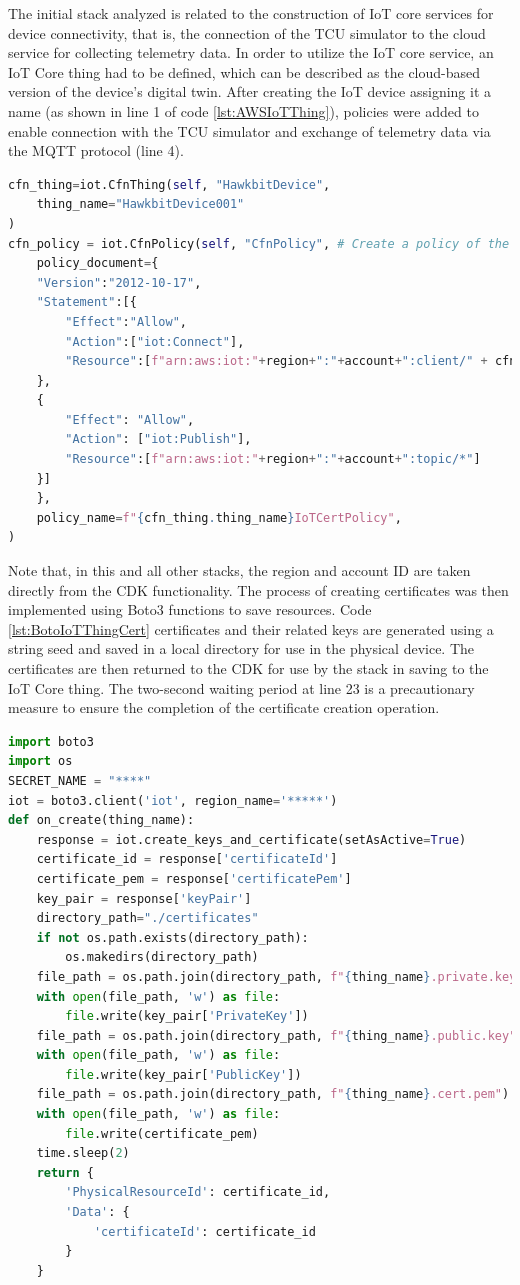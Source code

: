 The initial stack analyzed is related to the construction of IoT core services for device connectivity, that is, the connection of the TCU simulator to the cloud service for collecting telemetry data. In order to utilize the IoT core service, an IoT Core thing had to be defined, which can be described as the cloud-based version of the device's digital twin. After creating the IoT device assigning it a name (as shown in line 1 of code \ref{lst:AWSIoTThing}), policies were added to enable connection with the TCU simulator and exchange of telemetry data via the MQTT protocol (line 4).
\begin{lstlisting}[language=Python, caption={Code for the creation of IoT Core Thing and related policies}, label=lst:AWSIoTThing]
cfn_thing=iot.CfnThing(self, "HawkbitDevice",
    thing_name="HawkbitDevice001"
)
cfn_policy = iot.CfnPolicy(self, "CfnPolicy", # Create a policy of the certificate
    policy_document={
    "Version":"2012-10-17",
    "Statement":[{
        "Effect":"Allow",
        "Action":["iot:Connect"],
        "Resource":[f"arn:aws:iot:"+region+":"+account+":client/" + cfn_thing.thing_name]
    },
    {
        "Effect": "Allow",
        "Action": ["iot:Publish"],
        "Resource":[f"arn:aws:iot:"+region+":"+account+":topic/*"]
    }]
    },
    policy_name=f"{cfn_thing.thing_name}IoTCertPolicy",
)
\end{lstlisting}
Note that, in this and all other stacks, the region and account ID are taken directly from the CDK functionality.
The process of creating certificates was then implemented using Boto3 functions to save resources. Code \ref{lst:BotoIoTThingCert} certificates and their related keys are generated using a string seed and saved in a local directory for use in the physical device. The certificates are then returned to the CDK for use by the stack in saving to the IoT Core thing. The two-second waiting period at line 23 is a precautionary measure to ensure the completion of the certificate creation operation.
\begin{lstlisting}[language=Python, caption={Code for the creation of IoT Core Thing certificates and keys}, label=lst:BotoIoTThingCert]
import boto3
import os
SECRET_NAME = "****"
iot = boto3.client('iot', region_name='*****')
def on_create(thing_name):
    response = iot.create_keys_and_certificate(setAsActive=True)
    certificate_id = response['certificateId']
    certificate_pem = response['certificatePem']
    key_pair = response['keyPair']
    directory_path="./certificates"
    if not os.path.exists(directory_path):
        os.makedirs(directory_path)
    file_path = os.path.join(directory_path, f"{thing_name}.private.key")
    with open(file_path, 'w') as file:
        file.write(key_pair['PrivateKey'])
    file_path = os.path.join(directory_path, f"{thing_name}.public.key")
    with open(file_path, 'w') as file:
        file.write(key_pair['PublicKey'])
    file_path = os.path.join(directory_path, f"{thing_name}.cert.pem")
    with open(file_path, 'w') as file:
        file.write(certificate_pem)
    time.sleep(2)
    return {
        'PhysicalResourceId': certificate_id,
        'Data': {
            'certificateId': certificate_id
        }
    }
\end{lstlisting}

